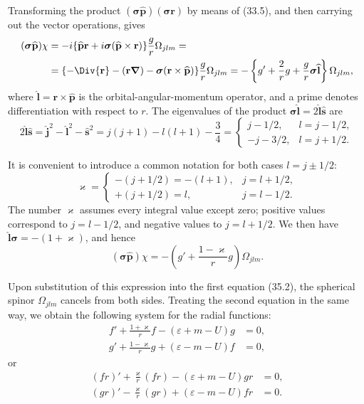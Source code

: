 Transforming the product $(\boldsymbol\sigma\widehat{\mathbf p})(\boldsymbol\sigma\mathbf r)$ by means of (33.5), and then carrying out the vector operations, gives
\[
\begin{aligned}
(\boldsymbol\sigma\widehat{\mathbf p})\chi
&=-i\{\widehat{\mathbf p}\mathbf r
+i\boldsymbol\sigma(\widehat{\mathbf p}\times\mathbf r)\}
\frac gr\Omega_{jlm}={}\\
&=\{-\Div{\mathbf r}-(\mathbf r\boldsymbol\nabla)
-\boldsymbol\sigma(\mathbf r\times\widehat{\mathbf p})\}
\frac gr\Omega_{jlm}
=-\left\{g'+\frac2r g+\frac gr\boldsymbol\sigma\widehat{\mathbf l}\right\}\Omega_{jlm},
\end{aligned}
\]
where $\widehat{\mathbf l}=\mathbf r\times\widehat{\mathbf p}$ is the orbital-angular-momentum operator, and a prime denotes differentiation with respect to $r$. The eigenvalues of the product $\boldsymbol\sigma\widehat{\mathbf l}=2\widehat{\mathbf l}\widehat{\mathbf s}$ are
\[
2\widehat{\mathbf l}\widehat{\mathbf s}
=\widehat{\mathbf j}^{2}-\widehat{\mathbf l}^{2}-\widehat{\mathbf s}^{2}
=j(j+1)-l(l+1)-\frac34
=\begin{cases}
j-1/2,&l=j-1/2,\\
-j-3/2,&l=j+1/2.
\end{cases}
\]

It is convenient to introduce a common notation for both cases $l=j\pm1/2$:
\begin{equation}
\varkappa=\begin{cases}
-(j+1/2)=-(l+1),&j=l+1/2,\\
+(j+1/2)=l,&j=l-1/2.
\end{cases}
\tag{35.3}
\end{equation}
The number $\varkappa$ assumes every integral value except zero; positive values correspond to $j=l-1/2$, and negative values to $j=l+1/2$. We then have $\widehat{\mathbf l}\boldsymbol\sigma=-(1+\varkappa)$, and hence
\[
(\boldsymbol\sigma\widehat{\mathbf p})\chi
=-\left(g'+\frac{1-\varkappa}{r}g\right)\Omega_{jlm}.
\]

Upon substitution of this expression into the first equation (35.2), the spherical spinor $\Omega_{jlm}$ cancels from both sides. Treating the second equation in the same way, we obtain the following system for the radial functions:
\begin{equation}
\begin{aligned}
f'+\frac{1+\varkappa}{r}f-(\varepsilon+m-U)g&=0,\\
g'+\frac{1-\varkappa}{r}g+(\varepsilon-m-U)f&=0,
\end{aligned}
\tag{35.4}
\end{equation}
or
\begin{equation}
\begin{aligned}
(fr)'+\frac\varkappa r(fr)-(\varepsilon+m-U)gr&=0,\\
(gr)'-\frac\varkappa r(gr)+(\varepsilon-m-U)fr&=0.
\end{aligned}
\tag{35.5}
\end{equation}

